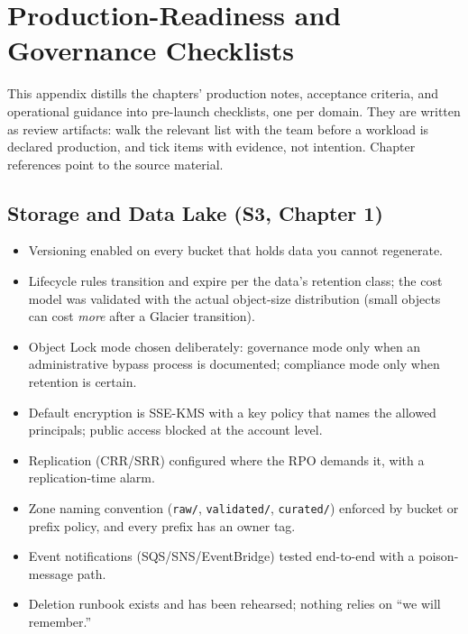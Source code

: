 \chapter{Production-Readiness and Governance Checklists}
%
This appendix distills the chapters' production notes, acceptance criteria, and operational
guidance into pre-launch checklists, one per domain. They are written as review artifacts: walk
the relevant list with the team before a workload is declared production, and tick items with
evidence, not intention. Chapter references point to the source material.

\providecommand{\chk}{\item[$\square$]}

\section{Storage and Data Lake (S3, Chapter 1)}
%
\begin{itemize}
\chk Versioning enabled on every bucket that holds data you cannot regenerate.
\chk Lifecycle rules transition and expire per the data's retention class; the cost model was
validated with the actual object-size distribution (small objects can cost \emph{more} after a
Glacier transition).
\chk Object Lock mode chosen deliberately: governance mode only when an administrative bypass
process is documented; compliance mode only when retention is certain.
\chk Default encryption is SSE-KMS with a key policy that names the allowed principals; public
access blocked at the account level.
\chk Replication (CRR/SRR) configured where the RPO demands it, with a replication-time alarm.
\chk Zone naming convention (\texttt{raw/}, \texttt{validated/}, \texttt{curated/}) enforced by
bucket or prefix policy, and every prefix has an owner tag.
\chk Event notifications (SQS/SNS/EventBridge) tested end-to-end with a poison-message path.
\chk Deletion runbook exists and has been rehearsed; nothing relies on ``we will remember.''
\end{itemize}

